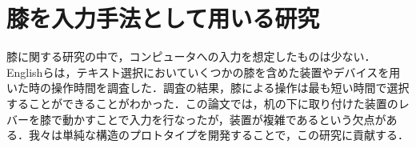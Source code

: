 \section{膝を入力手法として用いる研究}
膝に関する研究の中で，コンピュータへの入力を想定したものは少ない．
Englishら\cite{1698228}は，テキスト選択においていくつかの膝を含めた装置やデバイスを用いた時の操作時間を調査した．調査の結果，膝による操作は最も短い時間で選択することができることがわかった．この論文では，机の下に取り付けた装置のレバーを膝で動かすことで入力を行なったが，装置が複雑であるという欠点がある．我々は単純な構造のプロトタイプを開発することで，この研究に貢献する．




